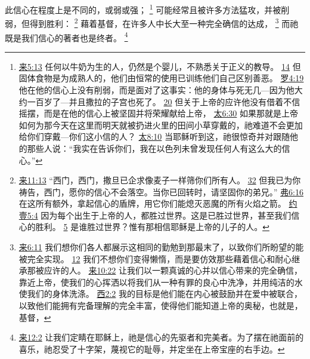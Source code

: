 \documentclass[12pt, a4paper, oneside]{ctexart}
\newcounter{parnum}[section]
\newcommand{\N}{%
   \noindent\refstepcounter{parnum}%
    \makebox[\parindent][l]{\textbf{\arabic{parnum}.}}}
\begin{document}
\N 此信心在程度上是不同的，或弱或强；
	\footnote {
		\href{https://biblehub.com/hebrews/5-13.htm}{来5:13} 任何以牛奶为生的人，仍然是个婴儿，不熟悉关于正义的教导。
		\href{https://biblehub.com/hebrews/5-14.htm}{14} 但固体食物是为成熟人的，他们由恒常的使用已训练他们自己区别善恶。
		\href{https://biblehub.com/romans/4-19.htm}{罗4:19} 他在他的信心上没有削弱，而是面对了这事实：他的身体与死无几---因为他大约一百岁了---并且撒拉的子宫也死了。
		\href{https://biblehub.com/romans/4-20.htm}{20} 但关于上帝的应许他没有借着不信摇摆，而是在他的信心上被坚固并将荣耀献给上帝，
		\href{https://biblehub.com/matthew/6-30.htm}{太6:30} 如果那就是上帝如何为那今天在这里而明天就被扔进火里的田间小草穿戴的，祂难道不会更加给你们穿戴---你们这小信的人？
		\href{https://biblehub.com/matthew/8-10.htm}{太8:10} 当耶稣听到这，祂很惊奇并对跟随他的那些人说：“我实在告诉你们，我在以色列未曾发现任何人有这么大的信心。”
	}
	可能经常且被许多方法猛攻，并被削弱，但得到胜利：
	\footnote {
		\href{https://biblehub.com/luke/22-31.htm}{来11:13} “西门，西门，撒旦已企求像麦子一样筛你们所有人。
		\href{https://biblehub.com/luke/22-32.htm}{32} 但我已为你祷告，西门，愿你的信心不会落空。当你已回转时，请坚固你的弟兄。”
		\href{https://biblehub.com/ephesians/6-16.htm}{弗6:16} 在这所有额外，拿起信心的盾牌，用它你们能熄灭恶魔的所有火焰之箭。
		\href{https://biblehub.com/1_john/5-4.htm}{约壹5:4} 因为每个出生于上帝的人，都胜过世界。这是已胜过世界，甚至我们信心的胜利。
		\href{https://biblehub.com/1_john/5-5.htm}{5} 是谁胜过世界？惟有那相信耶稣是上帝的儿子的人。
	}
	藉着基督，在许多人中长大至一种完全确信的达成，
	\footnote {
		\href{https://biblehub.com/hebrews/6-11.htm}{来6:11} 我们想你们各人都展示这相同的勤勉到那最末了，以致你们所盼望的能被完全实现。
		\href{https://biblehub.com/hebrews/6-12.htm}{12} 我们不想你们变得懒惰，而是要仿效那些藉着信心和耐心继承那被应许的人。
		\href{https://biblehub.com/hebrews/10-22.htm}{来10:22} 让我们以一颗真诚的心并以信心带来的完全确信，靠近上帝，使我们的心挥洒以将我们从一种有罪的良心中洗净，并用纯洁的水使我们的身体洗涤。
		\href{https://biblehub.com/colossians/2-2.htm}{西2:2} 我的目标是他们能在内心被鼓励并在爱中被联合，以致他们能拥有完备理解的完全丰富，使得他们能知道上帝的奥秘，也就是，基督，
	}
	而祂既是我们信心的著者也是终者。
	\footnote {
		\href{https://biblehub.com/hebrews/12-2.htm}{来12:2} 让我们定睛在耶稣上，祂是信心的先驱者和完美者。为了摆在祂面前的喜乐，祂忍受了十字架，蔑视它的耻辱，并定坐在上帝宝座的右手边。
	}
\end{document}
